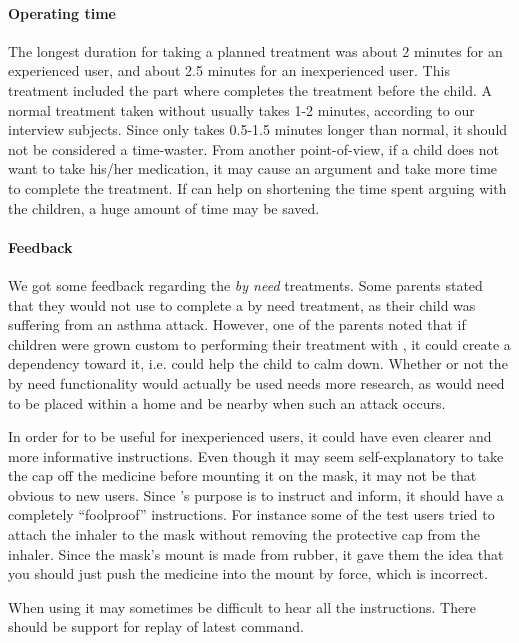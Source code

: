 \paragraph{Operating time}
The longest duration for taking a planned treatment was about 2 minutes for an experienced user, and about 2.5 minutes for an inexperienced user. This treatment included the part where \buddy{} completes the treatment before the child. A normal treatment taken without \ab{} usually takes 1-2 minutes, according to our interview subjects. Since \ab{} only takes 0.5-1.5 minutes longer than normal, it should not be considered a time-waster. From another point-of-view, if a child does not want to take his/her medication, it may cause an argument and take more time to complete the treatment. If \ab{} can help on shortening the time spent arguing with the children, a huge amount of time may be saved.      

\paragraph{Feedback}
We got some feedback regarding the \emph{by need} treatments. Some parents stated that they would not use \buddy{} to complete a by need treatment, as their child was suffering from an asthma attack. However, one of the parents noted that if children were grown custom to performing their treatment with \buddy{}, it could create a dependency toward it, i.e. \buddy{} could help the child to calm down. Whether or not the by need functionality would actually be used needs more research, as \buddy{} would need to be placed within a home and be nearby when such an attack occurs. 

In order for \ab{} to be useful for inexperienced users, it could have even clearer and more informative instructions. Even though it may seem self-explanatory to take the cap off the medicine before mounting it on the mask, it may not be that obvious to new users. Since \ab{}'s purpose is to instruct and inform, it should have a completely ``foolproof'' instructions. For instance some of the test users tried to attach the inhaler to the mask without removing the protective cap from the inhaler. Since the mask's mount is made from rubber, it gave them the idea that you should just push the medicine into the mount by force, which is incorrect. 

When using \ab{} it may sometimes be difficult to hear all the instructions. There should be support for replay of latest command.

